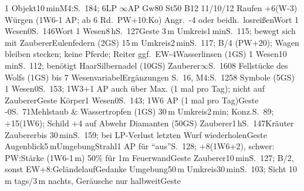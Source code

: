 \documentclass{m5figur-mv}[2016/01/04]
\begin{document}
{{} %

%
  {1 Objekt}{10\,min}{M4:S.~184; 6LP $\infty$AP Gw80 St50 B12 11/10/12
  Raufen +6(W-3) Würgen (1W6-1 AP; ab 6 Rd.\ PW+10:Ko)
  Angr.\ -4 oder beidh.\ losreißen}{Wort}
%
  {1 Wesen}{0}{S.~146}{Wort}
%
  {1 Wesen}{8\,h}{S.~127}{Geste}
%
  {3\,m Umkreis}{1\,min}{S.~115; bewegt sich mit Zauberer}{Eulenfedern (2GS)}
%
  {15\,m Umkreis}{2\,min}{S.~117; B/4 (PW+20); Wagen bleiben stecken;
  keine Pferde; Reiter ggf.\ EW-4}{Wasserlinsen (1GS)}
%
  {1 Wesen}{10\,min}{S.~112; benötigt Haar}{Silbernadel (10GS)}
%
  {Zauberer}{$\infty$}{S.~160}{8 Fellstücke des Wolfs (1GS)}
%
  {bis 7 Wesen}{variabel}{Ergänzungen S.~16, M4:S.~125}{8 Symbole (5GS)}
%
  {1 Wesen}{0}{S.~153; 1W3+1 AP auch über Max. (1 mal pro Tag);
  nicht auf Zauberer}{Geste}
%
  {Körper}{1 Wesen}{0}{S.~143; 1W6 AP (1 mal pro Tag)}{Geste}
%
  {-}{0}{S.~71}{Mehlstaub \& Wassertropfen (1GS)}
%
  {30\,m Umkreis}{2\,min; Konz.}{S.~89; +15(1W6); Schild +4 auf Abwehr}%
  {Diamanten (50GS)}
%
  {Zauberer}{1\,h}{S.~147}{Kräuter}
%
  {Zauberer}{bis 30\,min}{S.~159;
  bei LP-Verlust letzten Wurf wiederholen}{Geste}
%
  {Augenblick}{5\,m}{Umgebung}{Strahl}{1 AP für "`aus"'}{S.~128;
  +8(1W6+2), schwer: PW:Stärke (1W6-1\,m) 50\% für 1m Feuerwand}{Geste}
%
  {Zauberer}{10\,min}{S.~127; B/2, sonst EW+8:Geländelauf}{Gedanke}
%
  {Umgebung}{50\,m Umkreis}{30\,min}{S.~103; Sicht 10\,m tags/3\,m nachts,
  Geräusche nur halbweit}{Geste}

}
\end{document}
